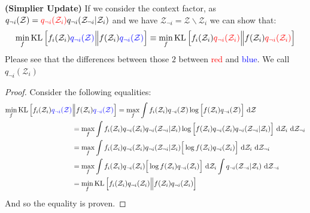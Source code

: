 \begin{proposition}{\textbf{(Simplier Update)}}
    If we consider the context factor, as $q_{\neg i}(\mathcal{Z}) = \textcolor{red}{q_{\neg i}(\mathcal{Z}_i)}q_{\neg i}(\mathcal{Z}_{\neg i} | \mathcal{Z}_i) $ and we have $\mathcal{Z}_{\neg i} = \mathcal{Z}\backslash \mathcal{Z}_{i}$ we can show that:
    \begin{equation*}
        \min_f \operatorname{KL}\left[  f_i(\mathcal{Z}_i)\textcolor{blue}{q_{\neg i}(\mathcal{Z})} \Big\| f(\mathcal{Z}_i)\textcolor{blue}{q_{\neg i}(\mathcal{Z})}  \right] \equiv \min_f \operatorname{KL}\left[  f_i(\mathcal{Z}_i)\textcolor{red}{q_{\neg i}(\mathcal{Z}_i)} \Big\| f(\mathcal{Z}_i)\textcolor{red}{q_{\neg i}(\mathcal{Z}_i)}  \right]
    \end{equation*}
    Please see that the differences between those $2$ between \textcolor{red}{red} and \textcolor{blue}{blue}. We call $q_{\neg i}(\mathcal{Z}_i)$
\end{proposition}
\begin{proof}
    Consider the following equalities:
    \begin{equation*}
    \begin{aligned}
        \min_f \operatorname{KL}\Big[ f_i(\mathcal{Z}_i)\textcolor{blue}{q_{\neg i}(\mathcal{Z})} &\Big\| f(\mathcal{Z}_i)\textcolor{blue}{q_{\neg i}(\mathcal{Z})} \Big] = \max_f \int f_i(\mathcal{Z}_i)q_{\neg i}(\mathcal{Z})\log\Big[ f(\mathcal{Z}_i)q_{\neg i}(\mathcal{Z}) \Big]\ \mathrm{d}\mathcal{Z} \\
        &= \max_f \int f_i(\mathcal{Z}_i) q_{\neg i}(\mathcal{Z}_i)q_{\neg i}(\mathcal{Z}_{\neg i} | \mathcal{Z}_i) \log\Big[ f(\mathcal{Z}_i) q_{\neg i}(\mathcal{Z}_i)q_{\neg i}(\mathcal{Z}_{\neg i} | \mathcal{Z}_i) \Big]\ \mathrm{d}\mathcal{Z}_i\ \mathrm{d}\mathcal{Z}_{\neg i} \\
        &= \max_f \int f_i(\mathcal{Z}_i) q_{\neg i}(\mathcal{Z}_i)q_{\neg i}(\mathcal{Z}_{\neg i} | \mathcal{Z}_i) \Big[ \log f(\mathcal{Z}_i) q_{\neg i}(\mathcal{Z}_i)\Big]\ \mathrm{d}\mathcal{Z}_i\ \mathrm{d}\mathcal{Z}_{\neg i} \\
        &= \max_f \int f_i(\mathcal{Z}_i) q_{\neg i}(\mathcal{Z}_i) \Big[ \log f(\mathcal{Z}_i) q_{\neg i}(\mathcal{Z}_i)\Big]\ \mathrm{d}\mathcal{Z}_i \int q_{\neg i}(\mathcal{Z}_{\neg i} | \mathcal{Z}_i) \ \mathrm{d}\mathcal{Z}_{\neg i} \\
        &= \min_f \operatorname{KL}\left[  f_i(\mathcal{Z}_i){q_{\neg i}(\mathcal{Z}_i)} \Big\| f(\mathcal{Z}_i){q_{\neg i}(\mathcal{Z}_i)}  \right]
    \end{aligned}
    \end{equation*}
    And so the equality is proven.
\end{proof}

